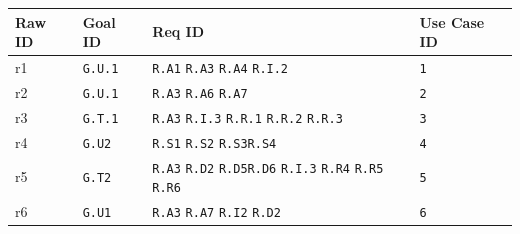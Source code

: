       \begin{table}[h!]
        \centering
        \begin{tabularx}{\linewidth}{|X|X|X|X|}
          \hline
          \textbf{Raw ID} & \textbf{Goal ID} & \textbf{Req ID} & \textbf{Use Case ID} \\
          \hline

	        r1 & \texttt{G.U.1} & \texttt{R.A1}  \newline \texttt{R.A3}  \newline \texttt{R.A4} \newline \texttt{R.I.2}& \texttt{1} \\
          \hline

	        r2 & \texttt{G.U.1} & \texttt{R.A3}  \newline \texttt{R.A6}  \newline \texttt{R.A7} & \texttt{2}  \\
	\hline

	        r3 & \texttt{G.T.1} & \texttt{R.A3}  \newline \texttt{R.I.3}  \newline \texttt{R.R.1} \newline \texttt{R.R.2} \newline \texttt{R.R.3}& \texttt{3}  \\
          \hline

          r4 & \texttt{G.U2} & \texttt{R.S1} \newline  \texttt{R.S2} \newline \texttt{R.S3}\newline \texttt{R.S4} & \texttt{4}   \\
          \hline

          r5 & \texttt{G.T2} & \texttt{R.A3} \newline  \texttt{R.D2} \newline \texttt{R.D5}\newline \texttt{R.D6}  \newline \texttt{R.I.3} \newline \texttt{R.R4}  \newline \texttt{R.R5}  \newline \texttt{R.R6} & \texttt{5}   \\
          \hline

          r6 & \texttt{G.U1} & \texttt{R.A3} \newline \texttt{R.A7} \newline  \texttt{R.I2} \newline  \texttt{R.D2} & \texttt{6}   \\
          \hline

      \end{tabularx}
      \end{table}

